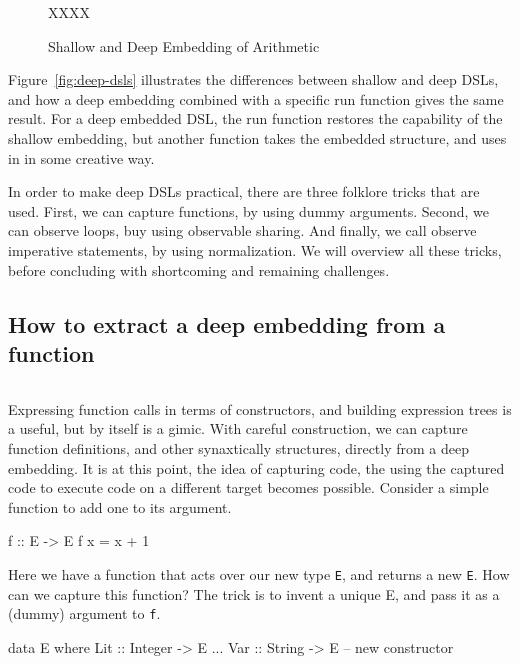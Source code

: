 \documentclass[11pt]{article}
\newcommand{\cursor}{%
\begin{center}
\marginpar{\vskip 4pt\sc Cursor}
\begin{tabular*}{\linewidth}{c}
\hline
\end{tabular*}
\end{center}
}
\begin{document}
\begin{figure}[!t]
  \centering
        XXXX
  \caption{Shallow and Deep Embedding of Arithmetic}
  \label{fig:counter-pictureX}
\end{figure}

Figure~\ref{fig:deep-dsls} illustrates the differences between shallow and deep DSLs,
and how a deep embedding combined with a specific run function gives the same result.
For a deep embedded DSL, the run function restores the capability of the shallow
embedding, but another function takes the embedded structure, and uses in in some creative way. 

In order to make deep DSLs practical, there are three folklore tricks that are used.
First, we can capture functions, by using dummy arguments. Second, we can observe loops,
buy using observable sharing. And finally, we call observe imperative statements,
by using normalization. We will overview all these tricks, before concluding
with shortcoming and remaining challenges.

\subsection{How to extract a deep embedding from a function}

\cursor{}

Expressing function calls in terms of constructors,  and
building expression trees is a useful, but by itself is a gimic. 
With careful construction, we can capture function definitions,
and other synaxtically structures,
directly from a deep embedding. It is at this
point, the idea of capturing code,
the using the captured code to execute code
on a different target becomes possible.
Consider a simple function to add one to its argument.

\begin{Code}

f :: E -> E
f x = x + 1
        
\end{Code}

Here we have a function that acts over our new type
\verb|E|, and returns a new \verb|E|. How can we capture
this function?
The trick is to invent a unique E, and pass it as a (dummy) argument
to \verb|f|.

\begin{Code}
data E where
  Lit :: Integer -> E
  ...
  Var :: String -> E    -- new constructor
\end{Code}        
\end{document}
